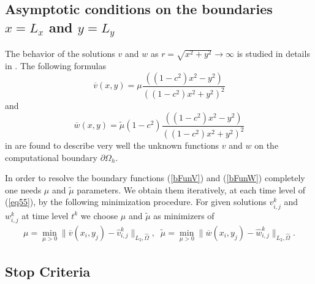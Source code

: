 \documentclass[preprint]{elsarticle}
\newcommand{\rf}[1]{(\ref{#1})}
\newcommand{\dO}{\partial\Omega_{h}}
\def\bar#1{{\overline{#1}}}
\begin{document}
 
\subsection{Asymptotic conditions on the  boundaries $x=L_x$ and $y=L_y$}

The behavior of the solutions $v$ and $w$  as $r =\sqrt{x^2 +y^2} \rightarrow \infty$ is studied in details in \cite{bnd,Ch2011,Ch2012}. The following formulas  
\begin{equation}\label{bFunV}
\bar{v}(x,y) = \mu \frac{( (1-c^2)x^2-y^2 )}{((1-c^2)x^2 + y^2)^2 }
\end{equation}
and
\begin{equation}\label{bFunW}
\bar{w}(x,y) =\tilde {\mu} (1-c^2) \frac{( (1-c^2)x^2-y^2 )}{((1-c^2)x^2 + y^2)^2 }
\end{equation}
in  \cite{bnd} are found to describe very well the unknown functions $v$ and $w$ on the computational boundary $\dO$. 

In order to resolve the boundary functions \rf{bFunV} and \rf{bFunW} completely one needs $\mu$ and $\tilde {\mu}$ parameters.
We obtain them iteratively, at each time level of \rf{eq55}, by the following minimization procedure. For  given solutions  $v^k_{i,j}$ and $ w^k_{i,j}$ at time level $t^k$ 
we choose $\mu$ and $\tilde {\mu}$ as minimizers of 
\begin{equation}\label{mu}
\begin{split}
\mu = \underset{\mu>0 }{\operatorname{min} } \| \bar{v}(x_i,y_j) - \widehat{v}^k_{i,j} \|_{L_2,\widehat{\Omega}},
\;\;
\tilde {\mu} = \underset{\mu>0 }{\operatorname{min} } \| \bar{w}(x_i,y_j) -\widehat{w}^k_{i,j} \|_{L_2,\widehat{\Omega}}.
\end{split}
\end{equation}
 
\subsection{Stop Criteria}
\end{document}
